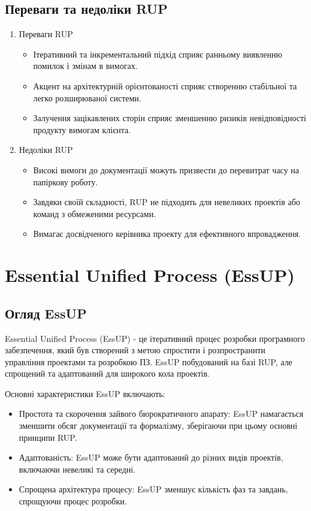 \documentclass[letterpaper]{report}
\begin{document}
		\subsection{Переваги та недоліки RUP}

			\begin{enumerate}
				\item Переваги RUP
					\begin{itemize}
						\item Ітеративний та інкрементальний підхід сприяє ранньому виявленню помилок і змінам в вимогах.
						\item Акцент на архітектурній орієнтованості сприяє створенню стабільної та легко розширюваної системи.
						\item Залучення зацікавлених сторін сприяє зменшенню ризиків невідповідності продукту вимогам клієнта.
					\end{itemize}
				\item Недоліки RUP
					\begin{itemize}
						\item Високі вимоги до документації можуть призвести до перевитрат часу на папіркову роботу.
						\item Завдяки своїй складності, RUP не підходить для невеликих проектів або команд з обмеженими ресурсами.
						\item Вимагає досвідченого керівника проекту для ефективного впровадження.
					\end{itemize}
			\end{enumerate}

	\section{Essential Unified Process (EssUP)}

		\subsection{Огляд EssUP}

			Essential Unified Process (EssUP) - це ітеративний процес розробки програмного забезпечення, який був створений з метою спростити і розпространити управління проектами та розробкою ПЗ. EssUP побудований на базі RUP, але спрощений та адаптований для широкого кола проектів.

			Основні характеристики EssUP включають:

			\begin{itemize}
				\item Простота та скорочення зайвого бюрократичного апарату: EssUP намагається зменшити обсяг документації та формалізму, зберігаючи при цьому основні принципи RUP.
				\item Адаптованість: EssUP може бути адаптований до різних видів проектів, включаючи невеликі та середні.
				\item Спрощена архітектура процесу: EssUP зменшує кількість фаз та завдань, спрощуючи процес розробки.
			\end{itemize}
\end{document}
